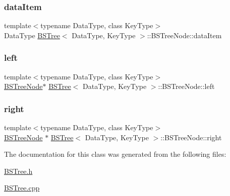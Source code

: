 \subsubsection{\texorpdfstring{data\+Item}{dataItem}}
{\footnotesize\ttfamily template$<$typename Data\+Type, class Key\+Type$>$ \\
Data\+Type \hyperlink{class_b_s_tree}{B\+S\+Tree}$<$ Data\+Type, Key\+Type $>$\+::B\+S\+Tree\+Node\+::data\+Item}

\hypertarget{class_b_s_tree_1_1_b_s_tree_node_a7a90150dd249432e240dc363955c5ca1}{}\label{class_b_s_tree_1_1_b_s_tree_node_a7a90150dd249432e240dc363955c5ca1} 
\subsubsection{\texorpdfstring{left}{left}}
{\footnotesize\ttfamily template$<$typename Data\+Type, class Key\+Type$>$ \\
\hyperlink{class_b_s_tree_1_1_b_s_tree_node}{B\+S\+Tree\+Node}$\ast$ \hyperlink{class_b_s_tree}{B\+S\+Tree}$<$ Data\+Type, Key\+Type $>$\+::B\+S\+Tree\+Node\+::left}

\hypertarget{class_b_s_tree_1_1_b_s_tree_node_a8d7bfd0208a562c8b8ab332e1d796563}{}\label{class_b_s_tree_1_1_b_s_tree_node_a8d7bfd0208a562c8b8ab332e1d796563} 
\subsubsection{\texorpdfstring{right}{right}}
{\footnotesize\ttfamily template$<$typename Data\+Type, class Key\+Type$>$ \\
\hyperlink{class_b_s_tree_1_1_b_s_tree_node}{B\+S\+Tree\+Node} $\ast$ \hyperlink{class_b_s_tree}{B\+S\+Tree}$<$ Data\+Type, Key\+Type $>$\+::B\+S\+Tree\+Node\+::right}



The documentation for this class was generated from the following files\+:\begin{DoxyCompactItemize}
\item 
\hyperlink{_b_s_tree_8h}{B\+S\+Tree.\+h}\item 
\hyperlink{_b_s_tree_8cpp}{B\+S\+Tree.\+cpp}\end{DoxyCompactItemize}

